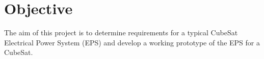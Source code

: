 \chapter{Objective}
\centering
The aim of this project is to determine requirements for a typical CubeSat Electrical Power System (EPS) and develop a working prototype of the EPS for a CubeSat.